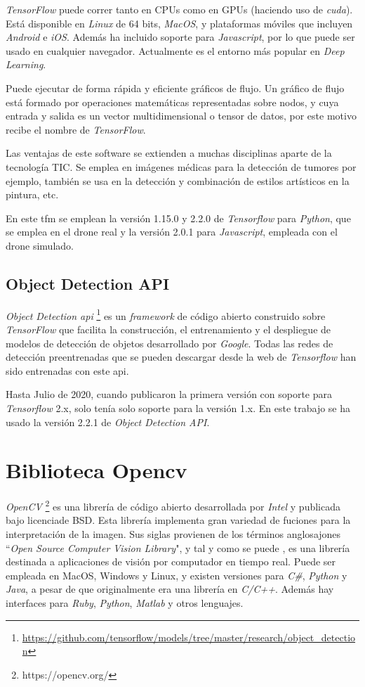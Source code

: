 \textit{TensorFlow} puede correr tanto en CPUs como en GPUs (haciendo uso de \textit{\acrfull{cuda}}). Está disponible en \textit{Linux} de 64 bits, \textit{MacOS}, y plataformas móviles que incluyen \textit{Android} e \textit{iOS}. Además ha incluido soporte para \textit{Javascript}, por lo que puede ser usado en cualquier navegador. Actualmente es el entorno más popular en \textit{Deep Learning}.

Puede ejecutar de forma rápida y eficiente gráficos de flujo. Un gráfico de flujo está formado por operaciones matemáticas representadas sobre nodos, y cuya entrada y salida es un vector multidimensional o tensor de datos, por este motivo recibe el nombre de \textit{TensorFlow}.

Las ventajas de este software se extienden a muchas disciplinas aparte de la tecnología TIC. Se emplea en imágenes médicas para la detección de tumores por ejemplo, también se usa en la detección y combinación de estilos artísticos en la pintura, etc.

En este \acrshort{tfm} se emplean la versión 1.15.0 y 2.2.0 de \textit{Tensorflow} para \textit{Python}, que se emplea en el drone real y la versión 2.0.1 para \textit{Javascript}, empleada con el drone simulado.
\subsection{Object Detection API}
\textit{Object Detection \acrshort{api}} \footnote{\url{https://github.com/tensorflow/models/tree/master/research/object_detection}} es un \textit{framework} de código abierto construido sobre \textit{TensorFlow} que facilita la construcción, el entrenamiento y el despliegue de modelos de detección de objetos desarrollado por \textit{Google}. Todas las redes de detección preentrenadas que se pueden descargar desde la web de \textit{Tensorflow} han sido entrenadas con este \acrshort{api}.

Hasta Julio de 2020, cuando publicaron la primera versión con soporte para \textit{Tensorflow} 2.x, solo tenía solo soporte para la versión 1.x.
En este trabajo se ha usado la versión 2.2.1 de \textit{Object Detection API}.
\section{Biblioteca Opencv}
\textit{OpenCV} \footnote{https://opencv.org/} es una librería de código abierto desarrollada por \textit{Intel} y publicada  bajo licenciade BSD. Esta librería implementa gran variedad de fuciones para la interpretación de la imagen. Sus  siglas  provienen  de  los  términos anglosajones ``\textit{Open Source Computer  Vision Library}", y tal y como se puede , es una librería destinada a aplicaciones de visión por computador en tiempo real. Puede ser empleada en MacOS, Windows y Linux, y existen versiones para \textit{C\#}, \textit{Python} y \textit{Java}, a pesar de que originalmente era una librería en \textit{C/C++}. Además hay interfaces para \textit{Ruby}, \textit{Python}, \textit{Matlab} y otros lenguajes.

